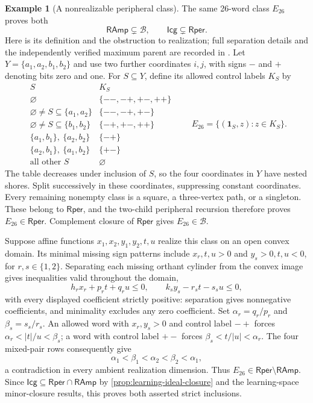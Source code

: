 \documentclass[11pt]{article}
\theoremstyle{definition}
\newtheorem{example}[proposition]{Example}
\newcommand{\RAmp}{\mathsf{RAmp}}
\newcommand{\Rper}{\mathsf{Rper}}
\begin{document}
\begin{example}[A nonrealizable peripheral class]\label{ex:e26-strictness}
The same 26-word class $E_{26}$ proves both
\[
 \RAmp\subsetneq\mathcal B,
 \qquad \mathsf{Icg}\subsetneq\Rper.
\]
Here is its definition and the obstruction to realization; full separation
details and the independently verified maximum parent are recorded in
\cite{Structural984}. Let $Y=\{a_1,a_2,b_1,b_2\}$ and use two further
coordinates $i,j$, with signs $-$ and $+$ denoting bits zero and one.
For $S\subseteq Y$, define its allowed control labels $K_S$ by
\[
\begin{array}{c|c}
 S & K_S\\ \hline
 \varnothing & \{--,-+,+-,++\}\\
 \varnothing\ne S\subseteq\{a_1,a_2\} & \{--,-+,+-\}\\
 \varnothing\ne S\subseteq\{b_1,b_2\} & \{-+,+-,++\}\\
 \{a_1,b_1\},\ \{a_2,b_2\} & \{-+\}\\
 \{a_2,b_1\},\ \{a_1,b_2\} & \{+-\}\\
 \text{all other }S & \varnothing
\end{array}
\qquad
 E_{26}=\{(\mathbf1_S,z):z\in K_S\}.
\]
The table decreases under inclusion of $S$, so the four coordinates in
$Y$ have nested shores. Split successively in these coordinates, suppressing
constant coordinates. Every remaining nonempty class is a square, a
three-vertex path, or a singleton. These belong to $\Rper$, and the
two-child peripheral recursion therefore proves $E_{26}\in\Rper$.
Complement closure of $\Rper$ gives $E_{26}\in\mathcal B$.

Suppose affine functions $x_1,x_2,y_1,y_2,t,u$ realize this class on an
open convex domain. Its minimal missing sign patterns include
$x_r,t,u>0$ and $y_s>0,t,u<0$, for $r,s\in\{1,2\}$.
Separating each missing orthant cylinder from the convex image gives
inequalities valid throughout the domain,
\[
 h_rx_r+p_rt+q_ru\le0,
 \qquad k_sy_s-r_st-s_su\le0,
\]
with every displayed coefficient strictly positive: separation gives
nonnegative coefficients, and minimality excludes any zero coefficient.
Set $\alpha_r=q_r/p_r$ and $\beta_s=s_s/r_s$.
An allowed word with $x_r,y_s>0$ and control label $-+$ forces
$\alpha_r<|t|/u<\beta_s$; a word with control label $+-$ forces
$\beta_s<t/|u|<\alpha_r$.
The four mixed-pair rows consequently give
\[
 \alpha_1<\beta_1<\alpha_2<\beta_2<\alpha_1,
\]
a contradiction in every ambient realization dimension. Thus
$E_{26}\in\Rper\setminus\RAmp$. Since
$\mathsf{Icg}\subseteq\Rper\cap\RAmp$ by
\cref{prop:learning-ideal-closure} and the learning-space minor-closure
results, this proves both asserted strict inclusions.
\end{example}
\end{document}
